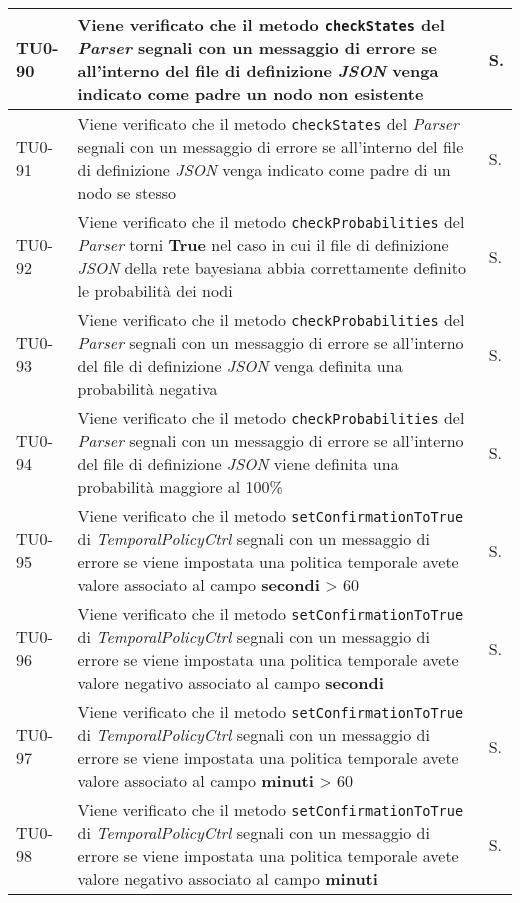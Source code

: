 \begin{longtable}{|C{.15\textwidth}|m{.66\textwidth}|C{.10\textwidth}|}
TU0-90 & Viene verificato che il metodo \texttt{checkStates} del \textit{Parser} segnali con un messaggio di errore se all'interno del file di definizione \textit{JSON} venga indicato come padre un nodo non esistente & S.\\
\hline
{}TU0-91 & Viene verificato che il metodo \texttt{checkStates} del \textit{Parser} segnali con un messaggio di errore se all'interno del file di definizione \textit{JSON} venga indicato come padre di un nodo se stesso & S.\\
\hline
TU0-92 & Viene verificato che il metodo \texttt{checkProbabilities} del \textit{Parser} torni \textbf{True} nel caso in cui il file di definizione \textit{JSON} della rete bayesiana abbia correttamente definito le probabilità dei nodi & S.\\
\hline
{}TU0-93 & Viene verificato che il metodo \texttt{checkProbabilities} del \textit{Parser} segnali con un messaggio di errore se all'interno del file di definizione \textit{JSON} venga definita una probabilità negativa & S.\\
\hline
TU0-94 & Viene verificato che il metodo \texttt{checkProbabilities} del \textit{Parser} segnali con un messaggio di errore se all'interno del file di definizione \textit{JSON} viene definita una probabilità maggiore al 100\% & S.\\
\hline
{}TU0-95 & Viene verificato che il metodo \texttt{setConfirmationToTrue} di \textit{TemporalPolicyCtrl} segnali con un messaggio di errore se viene impostata una politica temporale avete valore associato al campo \textbf{secondi} > 60 & S.\\
\hline
TU0-96 & Viene verificato che il metodo \texttt{setConfirmationToTrue} di \textit{TemporalPolicyCtrl} segnali con un messaggio di errore se viene impostata una politica temporale avete valore negativo associato al campo \textbf{secondi} & S.\\
\hline
{}TU0-97 & Viene verificato che il metodo \texttt{setConfirmationToTrue} di \textit{TemporalPolicyCtrl} segnali con un messaggio di errore se viene impostata una politica temporale avete valore associato al campo \textbf{minuti} > 60 & S.\\
\hline
TU0-98 & Viene verificato che il metodo \texttt{setConfirmationToTrue} di \textit{TemporalPolicyCtrl} segnali con un messaggio di errore se viene impostata una politica temporale avete valore negativo associato al campo \textbf{minuti} & S.\\
\hline

\end{longtable}
